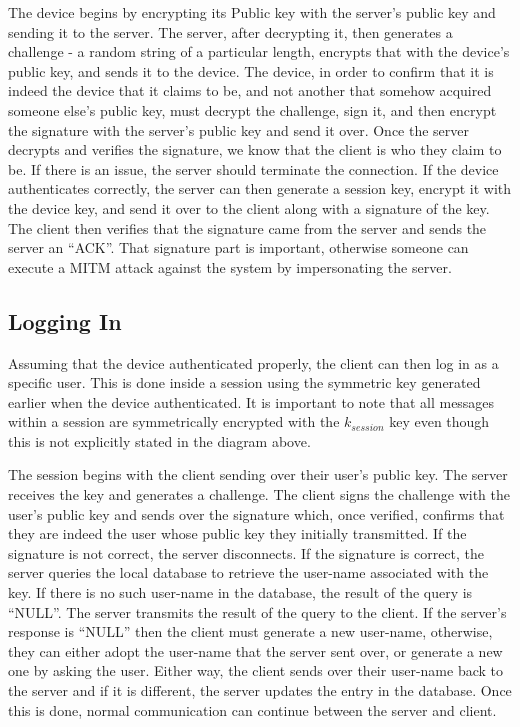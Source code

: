 \documentclass{article}
\begin{document}
The device begins by encrypting its Public key with the server's public key and sending it to the server. The server, after decrypting it, then generates a challenge - a random string of a particular length, encrypts that with the device's public key, and sends it to the device. The device, in order to confirm that it is indeed the device that it claims to be, and not another that somehow acquired someone else's public key, must decrypt the challenge, sign it, and then encrypt the signature with the server's public key and send it over. Once the server decrypts and verifies the signature, we know that the client is who they claim to be. If there is an issue, the server should terminate the connection. If the device authenticates correctly, the server can then generate a session key, encrypt it with the device key, and send it over to the client along with a signature of the key. The client then verifies that the signature came from the server and sends the server an ``ACK''. That signature part is important, otherwise someone can execute a MITM attack against the system by impersonating the server.

\subsection{Logging In}

Assuming that the device authenticated properly, the client can then log in as a specific user. This is done inside a session using the symmetric key generated earlier when the device authenticated. It is important to note that all messages within a session are symmetrically encrypted with the $k_{session}$ key even though this is not explicitly stated in the diagram above.

The session begins with the client sending over their user's public key. The server receives the key and generates a challenge. The client signs the challenge with the user's public key and sends over the signature which, once verified, confirms that they are indeed the user whose public key they initially transmitted. If the signature is not correct, the server disconnects. If the signature is correct, the server queries the local database to retrieve the user-name associated with the key. If there is no such user-name in the database, the result of the query is ``NULL''. The server transmits the result of the query to the client. If the server's response is ``NULL'' then the client must generate a new user-name, otherwise, they can either adopt the user-name that the server sent over, or generate a new one by asking the user. Either way, the client sends over their user-name back to the server and if it is different, the server updates the entry in the database. Once this is done, normal communication can continue between the server and client.
\end{document}
